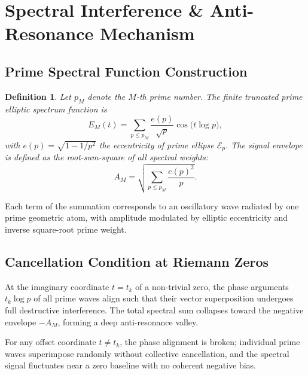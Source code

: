 \documentclass[10pt,reqno]{article}
\newcommand{\eprimep}{e(p)}
\newcommand{\EMt}{E_M(t)}
\newtheorem{defn}{Definition}[section]
\begin{document}
\section{Spectral Interference \& Anti-Resonance Mechanism}
\label{sec:spectral}

\subsection{Prime Spectral Function Construction}
\label{subsec:spectral-func}

\begin{defn}\label{def:spectral}
Let $p_M$ denote the $M$-th prime number. The finite truncated prime elliptic spectrum function is
\begin{equation}
\EMt = \sum_{p\le p_M} \frac{\eprimep}{\sqrt{p}}\cos\bigl(t\log p\bigr),
\label{eq:EMt}
\end{equation}
with $\eprimep=\sqrt{1-1/p^2}$ the eccentricity of prime ellipse $\mathcal{E}_p$. The signal envelope is defined as the root-sum-square of all spectral weights:
\begin{equation}
A_M = \sqrt{\sum_{p\le p_M}\frac{\eprimep^2}{p}}.
\label{eq:envelope}
\end{equation}
\end{defn}
Each term of the summation corresponds to an oscillatory wave radiated by one prime geometric atom, with amplitude modulated by elliptic eccentricity and inverse square-root prime weight.

\subsection{Cancellation Condition at Riemann Zeros}
\label{subsec:cancellation}

At the imaginary coordinate $t=t_k$ of a non-trivial zero, the phase arguments $t_k\log p$ of all prime waves align such that their vector superposition undergoes full destructive interference. The total spectral sum collapses toward the negative envelope $-A_M$, forming a deep anti-resonance valley.

For any offset coordinate $t\neq t_k$, the phase alignment is broken; individual prime waves superimpose randomly without collective cancellation, and the spectral signal fluctuates near a zero baseline with no coherent negative bias.
\end{document}
